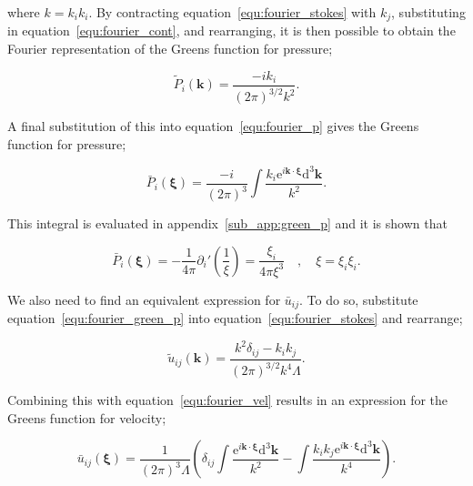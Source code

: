 \documentclass[12pt]{article}
\begin{document}
where $k = k_{i} k_{i}$. By contracting equation~\ref{equ:fourier_stokes} with $k_{j}$, substituting in equation~\ref{equ:fourier_cont}, and rearranging, it is then possible to obtain the Fourier representation of the Greens function for pressure;

\begin{equation}
\label{equ:fourier_green_p}
\tilde{P}_{i} (\boldsymbol{k}) = \frac{-i k_{i}}{(2 \pi)^{3/2} k^{2}}.
\end{equation}

A final substitution of this into equation~\ref{equ:fourier_p} gives the Greens function for pressure;

\begin{equation}
\label{equ:green_p_int}
\bar{P}_{i} (\boldsymbol\xi) = \frac{-i}{(2 \pi)^{3}} \int \frac{k_{i} \mathrm{e}^{i \boldsymbol{k} \cdot \boldsymbol{\xi}} \mathrm{d}^{3} \boldsymbol{k}}{k^{2}} .
\end{equation}

This integral is evaluated in appendix~\ref{sub_app:green_p} and it is shown that

\begin{equation}
\label{equ:green_p}
\bar{P}_{i} (\boldsymbol\xi) = -\frac{1}{4 \pi} \partial_{i}' \left(\frac{1}{\xi}\right) = \frac{\xi_{i}}{4 \pi \xi^{3}} \quad , \quad \xi = \xi_{i} \xi_{i} .
\end{equation}

We also need to find an equivalent expression for $\bar{u}_{ij}$. To do so, substitute equation~\ref{equ:fourier_green_p} into equation~\ref{equ:fourier_stokes} and rearrange;

\begin{equation}
\label{equ:fourier_green_u}
\tilde{u}_{ij} (\boldsymbol{k}) = \frac{k^{2} \delta_{ij} - k_{i} k_{j}}{(2 \pi)^{3/2} k^{4} \Lambda} .
\end{equation}

Combining this with equation~\ref{equ:fourier_vel} results in an expression for the Greens function for velocity;

\begin{equation}
\label{equ:green_u_int}
\bar{u}_{ij} (\boldsymbol\xi) = \frac{1}{(2 \pi)^{3} \Lambda} \left(\delta_{ij} \int \frac{\mathrm{e}^{i \boldsymbol{k} \cdot \boldsymbol\xi} \mathrm{d}^{3} \boldsymbol{k}}{k^{2}} - \int \frac{k_{i} k_{j} \mathrm{e}^{i \boldsymbol{k} \cdot \boldsymbol\xi} \mathrm{d}^{3} \boldsymbol{k}}{k^{4}} \right).
\end{equation}
\end{document}
